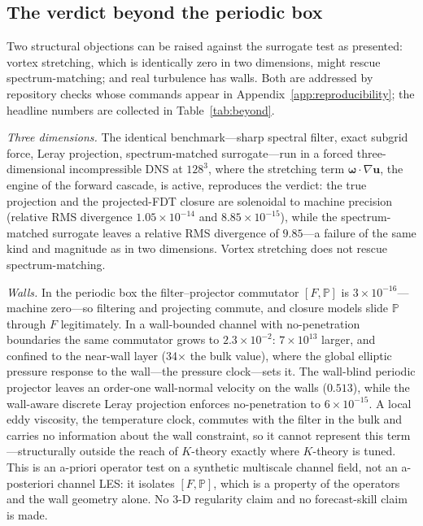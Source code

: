 \documentclass[11pt]{article}
\begin{document}
\subsection{The verdict beyond the periodic box}
\label{sec:beyond}

Two structural objections can be raised against the surrogate test as presented: vortex stretching, which is identically zero in two dimensions, might rescue spectrum-matching; and real turbulence has walls. Both are addressed by repository checks whose commands appear in Appendix~\ref{app:reproducibility}; the headline numbers are collected in Table~\ref{tab:beyond}.

\emph{Three dimensions.} The identical benchmark---sharp spectral filter, exact subgrid force, Leray projection, spectrum-matched surrogate---run in a forced three-dimensional incompressible DNS at $128^3$, where the stretching term $\boldsymbol{\omega}\cdot\nabla\mathbf{u}$, the engine of the forward cascade, is active, reproduces the verdict: the true projection and the projected-FDT closure are solenoidal to machine precision (relative RMS divergence $1.05\times10^{-14}$ and $8.85\times10^{-15}$), while the spectrum-matched surrogate leaves a relative RMS divergence of $9.85$---a failure of the same kind and magnitude as in two dimensions. Vortex stretching does not rescue spectrum-matching.

\emph{Walls.} In the periodic box the filter--projector commutator $[F,\mathbb{P}]$ is $3\times10^{-16}$---machine zero---so filtering and projecting commute, and closure models slide $\mathbb{P}$ through $F$ legitimately. In a wall-bounded channel with no-penetration boundaries the same commutator grows to $2.3\times10^{-2}$: $7\times10^{13}$ larger, and confined to the near-wall layer (34$\times$ the bulk value), where the global elliptic pressure response to the wall---the pressure clock---sets it. The wall-blind periodic projector leaves an order-one wall-normal velocity on the walls ($0.513$), while the wall-aware discrete Leray projection enforces no-penetration to $6\times10^{-15}$. A local eddy viscosity, the temperature clock, commutes with the filter in the bulk and carries no information about the wall constraint, so it cannot represent this term---structurally outside the reach of $K$-theory exactly where $K$-theory is tuned. This is an a-priori operator test on a synthetic multiscale channel field, not an a-posteriori channel LES: it isolates $[F,\mathbb{P}]$, which is a property of the operators and the wall geometry alone. No 3-D regularity claim and no forecast-skill claim is made.
\end{document}
